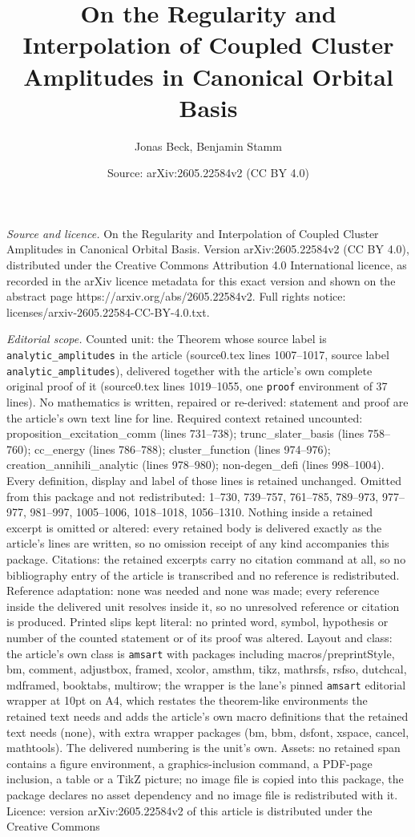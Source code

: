 \documentclass[10pt,a4paper]{amsart}
\title[On the Regularity and Interpolation of Coupled Cluster Ampli]{On the Regularity and Interpolation of Coupled Cluster Amplitudes in Canonical Orbital Basis}
\author{Jonas Beck, Benjamin Stamm}
\date{Source: arXiv:2605.22584v2 (CC BY 4.0)}
\begin{document}
\maketitle

\noindent\emph{Source and licence.} On the Regularity and Interpolation of Coupled Cluster Amplitudes in Canonical Orbital Basis. Version arXiv:2605.22584v2 (CC BY 4.0), distributed under the Creative Commons Attribution 4.0 International licence, as recorded in the arXiv licence metadata for this exact version and shown on the abstract page https://arxiv.org/abs/2605.22584v2. Full rights notice: licenses/arxiv-2605.22584-CC-BY-4.0.txt.\par\smallskip

\noindent\textit{Editorial scope.} Counted unit: the Theorem whose source label is \texttt{analytic\_amplitudes} in the article (source0.tex lines 1007--1017, source label \texttt{analytic\_amplitudes}), delivered together with the article's own complete original proof of it (source0.tex lines 1019--1055, one \texttt{proof} environment of 37 lines). No mathematics is written, repaired or re-derived: statement and proof are the article's own text line for line. Required context retained uncounted: proposition\_excitation\_comm (lines 731--738); trunc\_slater\_basis (lines 758--760); cc\_energy (lines 786--788); cluster\_function (lines 974--976); creation\_annihili\_analytic (lines 978--980); non-degen\_defi (lines 998--1004). Every definition, display and label of those lines is retained unchanged. Omitted from this package and not redistributed: 1--730, 739--757, 761--785, 789--973, 977--977, 981--997, 1005--1006, 1018--1018, 1056--1310. Nothing inside a retained excerpt is omitted or altered: every retained body is delivered exactly as the article's lines are written, so no omission receipt of any kind accompanies this package. Citations: the retained excerpts carry no citation command at all, so no bibliography entry of the article is transcribed and no reference is redistributed. Reference adaptation: none was needed and none was made; every reference inside the delivered unit resolves inside it, so no unresolved reference or citation is produced. Printed slips kept literal: no printed word, symbol, hypothesis or number of the counted statement or of its proof was altered. Layout and class: the article's own class is \texttt{amsart} with packages including macros/preprintStyle, bm, comment, adjustbox, framed, xcolor, amsthm, tikz, mathrsfs, rsfso, dutchcal, mdframed, booktabs, multirow; the wrapper is the lane's pinned \texttt{amsart} editorial wrapper at 10pt on A4, which restates the theorem-like environments the retained text needs and adds the article's own macro definitions that the retained text needs (none), with extra wrapper packages (bm, bbm, dsfont, xspace, cancel, mathtools). The delivered numbering is the unit's own. Assets: no retained span contains a figure environment, a graphics-inclusion command, a PDF-page inclusion, a table or a TikZ picture; no image file is copied into this package, the package declares no asset dependency and no image file is redistributed with it. Licence: version arXiv:2605.22584v2 of this article is distributed under the Creative Commons 
\end{document}
